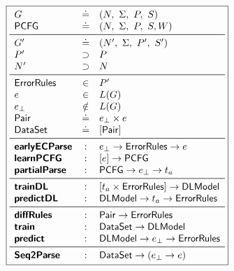 \begin{figure}[h]
\small
\begin{minipage}[c]{\linewidth}
  \lstDeleteShortInline{|}
  \[
  \boxed{
  \begin{array}{lcl}
    G              & \defeq  & (N,\ \Sigma,\ P,\ S) \\
    \pcfgsym       & \defeq  & (N,\ \Sigma,\ P,\ S, W) \\
    \midrule
    G'             & \defeq  & (N',\ \Sigma,\ P',\ S') \\
    P'             & \supset & P \\
    N'             & \supset & N \\
    \midrule
    \errorrulessym & \in     & P' \\
    e              & \in    & L(G) \\
    e_{\bot}       & \notin & L(G) \\
    \pairsym      & \defeq & e_{\bot} \times e \\
    \datasetsym   & \defeq & \List{\pairsym} \\
    \midrule
    \ecepsym       & : & e_{\bot} \to \errorrulessym \to e \\
    \learnPCFGsym  & : & \List{e} \to \pcfgsym \\
    \partialsym    & : & \pcfgsym \to e_{\bot} \to t_a  \\
    \midrule
    \trainDLsym    & : & \List{t_a \times \errorrulessym} \to \Model \\
    \predictDLsym  & : & \Model \to t_a \to \errorrulessym \\
    \midrule
    \diffsym       & : & \pairsym \to \errorrulessym \\
    \trainsym      & : & \datasetsym \to \Model \\
    \predictsym    & : & \Model \to e_{\bot} \to \errorrulessym \\
    \midrule
    \systemsym     & : & \datasetsym \to (e_{\bot} \to e) \\
  \end{array}
  }
  \]
  \lstMakeShortInline[mathescape=true]{|}
  \label{fig:api}
\end{minipage}
\end{figure}
